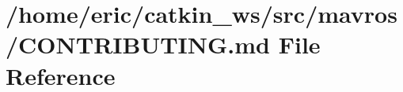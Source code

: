 \hypertarget{mavros_2CONTRIBUTING_8md}{}\section{/home/eric/catkin\+\_\+ws/src/mavros/\+C\+O\+N\+T\+R\+I\+B\+U\+T\+I\+NG.md File Reference}
\label{mavros_2CONTRIBUTING_8md}
